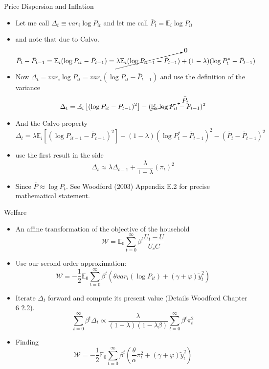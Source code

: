 \documentclass[11pt,aspectratio=169,xcolor={dvipsnames},hyperref={pdftex,pdfpagemode=UseNone,hidelinks,pdfdisplaydoctitle=true},usepdftitle=false]{beamer}
\begin{document}
\begin{frame}{Price Dispersion and Inflation}
\begin{itemize}
\item Let me call $\Delta_t \equiv	var_i \log P_{it}$ and let me call $\bar{P}_t = \mathbb{E}_i \log P_{it}$
\item and note that due to Calvo.
$$\bar{P}_t - \bar{P}_{t-1} = \mathbb{E}_i (\log P_{it} - \bar{P}_{t-1}) = \cancelto{0}{\lambda \mathbb{E}_i (\log P_{it-1} - \bar{P}_{t-1})} + (1-\lambda)(\log P^*_t - \bar{P}_{t-1}) $$
\item Now $\Delta_t = var_i \log P_{it} = var_i (\log P_{it} - \bar{P}_{t-1})$ and use the definition of the variance
$$\Delta_t = \mathbb{E}_i \left[ (\log P_{it} - \bar{P}_{t-1})^2 \right] - (\cancelto{\bar{P}_t}{\mathbb{E}_i \log P_{it}} - \bar{P}_{t-1})^2$$
\item And the Calvo property
$$\Delta_t = \lambda \mathbb{E}_i \left[ (\log P_{it-1} - \bar{P}_{t-1})^2 \right] + (1-\lambda)(\log P_t^* - \bar{P}_{t-1})^2 -  (\bar{P}_t - \bar{P}_{t-1})^2$$
\item use the first result in the side
$$\Delta_t \approx \lambda \Delta_{t-1} + \frac{\lambda}{1-\lambda}  (\pi_t)^2$$
\item Since $\bar{P} \approx \log P_t$. See Woodford (2003) Appendix E.2 for precise mathematical statement.
\end{itemize}
\end{frame}

\begin{frame}{Welfare}
\begin{itemize}
\item An affine transformation of the objective of the household
$$\mathcal{W} = \mathbb{E}_0 \sum_{t=0}^{\infty} \beta^t \frac{U_t - U}{U_c C}$$
\item Use our second order approximation:
$$\mathcal{W} = -\frac{1}{2 }\mathbb{E}_0 \sum_{t=0}^{\infty} \beta^t \left(\theta var_i ( \log P_{it}) + (\gamma + \varphi) \tilde{y}^2_t \right)$$
\item Iterate $\Delta_t$ forward and compute its present value (Details Woodford Chapter 6 2.2).
$$\sum_{t=0}^{\infty} \beta^t \Delta_t \propto \frac{\lambda}{(1-\lambda)(1-\lambda\beta)} \sum_{t=0}^{\infty} \beta^t \pi^2_t$$
\item Finding
$$\mathcal{W} = -\frac{1}{2 }\mathbb{E}_0 \sum_{t=0}^{\infty} \beta^t \left(\frac{\theta}{\alpha}\pi^2_t + (\gamma + \varphi) \tilde{y}^2_t \right)$$
\end{itemize}
\end{frame}
\end{document}
